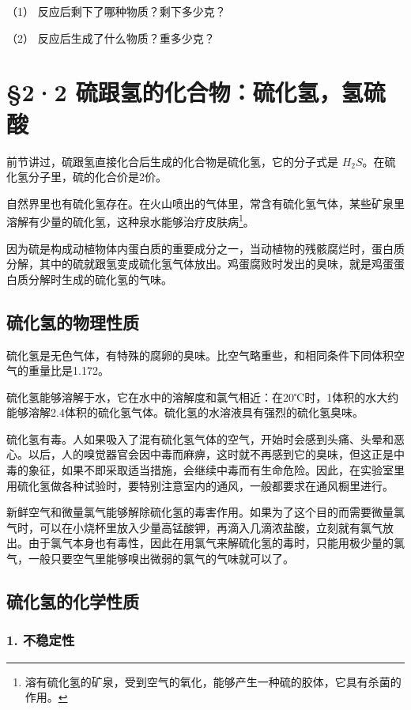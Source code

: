 （1） 反应后剩下了哪种物质？剩下多少克？

（2） 反应后生成了什么物质？重多少克？

\section{§2·2 硫跟氢的化合物：硫化氢，氢硫酸}

前节讲过，硫跟氢直接化合后生成的化合物是硫化氢，它的分子式是
\(H_{2}S\)。在硫化氢分子里，硫的化合价是2价。

自然界里也有硫化氢存在。在火山喷出的气体里，常含有硫化氢气体，某些矿泉里溶解有少量的硫化氢，这种泉水能够治疗皮肤病\footnote{溶有硫化氢的矿泉，受到空气的氧化，能够产生一种硫的胶体，它具有杀菌的作用。}。

因为硫是构成动植物体内蛋白质的重要成分之一，当动植物的残骸腐烂时，蛋白质分解，其中的硫就跟氢变成硫化氢气体放出。鸡蛋腐败时发出的臭味，就是鸡蛋蛋白质分解时生成的硫化氢的气味。

\subsection{硫化氢的物理性质}

硫化氢是无色气体，有特殊的腐卵的臭味。比空气略重些，和相同条件下同体积空气的重量比是1.172。

硫化氢能够溶解于水，它在水中的溶解度和氯气相近：在20℃时，1体积的水大约能够溶解2.4体积的硫化氢气体。硫化氢的水溶液具有强烈的硫化氢臭味。

硫化氢有毒。人如果吸入了混有硫化氢气体的空气，开始时会感到头痛、头晕和恶心。以后，人的嗅觉器官会因中毒而麻痹，这时就不再感到它的臭味，但这正是中毒的象征，如果不即采取适当措施，会继续中毒而有生命危险。因此，在实验室里用硫化氢做各种试验时，要特别注意室内的通风，一般都要求在通风橱里进行。

新鲜空气和微量氯气能够解除硫化氢的毒害作用。如果为了这个目的而需要微量氯气时，可以在小烧杯里放入少量高锰酸钾，再滴入几滴浓盐酸，立刻就有氯气放出。由于氯气本身也有毒性，因此在用氯气来解硫化氢的毒时，只能用极少量的氯气，一般只要空气里能够嗅出微弱的氯气的气味就可以了。

\subsection{硫化氢的化学性质}

\subsubsection{1. 不稳定性}

